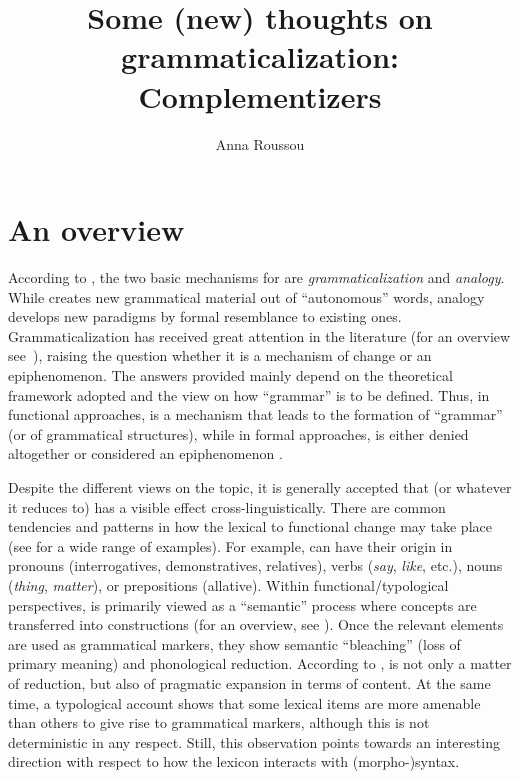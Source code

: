\documentclass[output=paper]{langsci/langscibook}
\author{Anna Roussou\affiliation{University of Patras}}
\title{Some (new) thoughts on grammaticalization: Complementizers}
\begin{document}
\glsresetall


\section{An overview}

According to \citet{Meillet:1912}, the two basic mechanisms for  are \emph{grammaticalization} and \emph{analogy}. While
 creates new grammatical material out of
\enquote{autonomous} words, analogy develops new paradigms by formal
resemblance to existing ones. Grammaticalization has
received great attention in the literature (for an overview
see~\citealt{NarHei2011}), raising the question whether it is a mechanism of
change or an epiphenomenon. The answers provided mainly depend on the
theoretical framework adopted and the view on how \enquote{grammar} is to be
defined.  Thus, in functional approaches,  is a
mechanism that leads to the formation of \enquote{grammar} (or of grammatical
structures), while in formal approaches,  is either
denied altogether
\parencite{Newmeyer1998,Lightfoot1998,Lightfoot2006,Janda2001,Joseph2011} or
considered an epiphenomenon \parencite{RobRou2003,vanGelderen2004}.

Despite the different views on the topic, it is generally accepted that
 (or whatever it reduces to) has a visible effect
cross{}-linguistically. There are common tendencies and patterns in how the
lexical to functional change may take place (see \citealt{HeiKut2002} for a
wide range of examples). For example,  can have their
origin in pronouns (in\-ter\-rog\-a\-tives, demon\-stra\-tives, relatives),
verbs (\emph{say}, \emph{like}, etc.), nouns (\emph{thing}, \emph{matter}), or
prepositions (allative). Within functional/typological perspectives,
 is pri\-mar\-i\-ly viewed as a \enquote{semantic}
process where concepts are transferred into constructions (for an overview, see
\citealt{HoppTrau2003}). Once the relevant elements are used as grammatical
markers, they show semantic \enquote{bleaching} (loss of primary meaning) and
phonological reduction. According to \citet{Traugott2010},
 is not only a matter of reduction, but also of
pragmatic expansion in terms of content. At the same time, a typological
account shows that some lexical items are more amenable than others to give
rise to grammatical markers, although this is not deterministic in any respect.
Still, this observation points towards an interesting direction with respect to
how the lexicon interacts with (morpho-)syntax.
\end{document}
